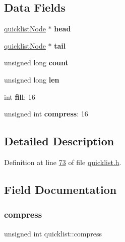 \subsection*{Data Fields}
\begin{DoxyCompactItemize}
\item 
\mbox{\label{structquicklist_a7ac8ca1117d875b12a219b2ada754e4b}} 
\hyperlink{structquicklistNode}{quicklist\+Node} $\ast$ {\bfseries head}
\item 
\mbox{\label{structquicklist_af78900edba2a2d2f83599c362f0bc1b0}} 
\hyperlink{structquicklistNode}{quicklist\+Node} $\ast$ {\bfseries tail}
\item 
\mbox{\label{structquicklist_ae01a064383db201bda229445ac9e309b}} 
unsigned long {\bfseries count}
\item 
\mbox{\label{structquicklist_a35a5c4c4e533b277aedab1bb6c193f76}} 
unsigned long {\bfseries len}
\item 
\mbox{\label{structquicklist_a405f7313891bdb6c29b937b04fa468ee}} 
int {\bfseries fill}\+: 16
\item 
\mbox{\label{structquicklist_aa2146eea57a1409447f8cbfa71396a25}} 
unsigned int {\bfseries compress}\+: 16
\end{DoxyCompactItemize}


\subsection{Detailed Description}


Definition at line \hyperlink{quicklist_8h_source_l00073}{73} of file \hyperlink{quicklist_8h_source}{quicklist.\+h}.



\subsection{Field Documentation}
\mbox{\label{structquicklist_aa2146eea57a1409447f8cbfa71396a25}} 
\subsubsection{\texorpdfstring{compress}{compress}}
{\footnotesize\ttfamily unsigned int quicklist\+::compress}



